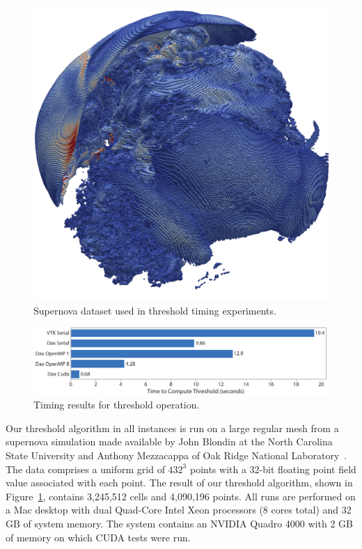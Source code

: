 \documentclass[conference]{IEEEtran}
\newcommand*{\lcite}[1]{~\cite{#1}}
\begin{document}
\begin{figure}[ht]
  \centering
  \includegraphics[width=\linewidth]{images/SupernovaThreshold}
  \caption{Supernova dataset used in threshold timing experiments.}
  \label{fig:Supernova}
\end{figure}

\begin{figure}
  \centering
  \includegraphics[width=\linewidth]{images/ThresholdTiming}
  \caption{Timing results for threshold operation.}
  \label{fig:Timing}
\end{figure}

Our threshold algorithm in all instances is run on a large regular mesh
from a supernova simulation made available by John Blondin at the North
Carolina State University and Anthony Mezzacappa of Oak Ridge National
Laboratory\lcite{Blondin2003}.  The data comprises a uniform grid of
$432^3$ points with a 32-bit floating point field value associated with
each point.  The result of our threshold algorithm, shown in
Figure~\ref{fig:Supernova}, contains 3,245,512 cells and 4,090,196 points.
All runs are performed on a Mac desktop with dual Quad-Core Intel Xeon
processors (8 cores total) and 32 GB of system memory.  The system contains
an NVIDIA Quadro 4000 with 2 GB of memory on which CUDA tests were run.
\end{document}
